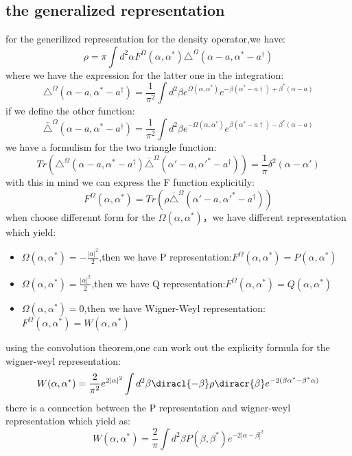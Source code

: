\subsection{the generalized representation}
for the generilized representation for the density operator,we have:
\[\rho=\pi\int d^2\alpha F^{\Omega}(\alpha,\alpha^*)\triangle^{\Omega}(\alpha-a,\alpha^*-a^\dagger)\]
where we have the expression for the latter one in the integration:
\[\triangle^{\Omega}(\alpha-a,\alpha^*-a^\dagger)=\frac{1}{\pi^2}\int d^2\beta e^{\Omega(\alpha,\alpha^*)}e^{-\beta(\alpha^*-a\dagger)+\beta^*(\alpha-a)}\]
if we define the other function:
\[\bar{\triangle}^{\Omega}(\alpha-a,\alpha^*-a^\dagger)=\frac{1}{\pi^2}\int d^2\beta e^{-\Omega(\alpha,\alpha^*)}e^{\beta(\alpha^*-a\dagger)-\beta^*(\alpha-a)}\]
we have a formulism for the two triangle function:
\[Tr(\triangle^{\Omega}(\alpha-a,\alpha^*-a^\dagger)\bar{\triangle}^{\Omega}(\alpha'-a,\alpha'^*-a^\dagger))=\frac{1}{\pi}\delta^2(\alpha-\alpha')\]
with this in mind we can express the F function explicitily:
\[F^{\Omega}(\alpha,\alpha^*)=Tr(\rho\bar{\triangle}^{\Omega}(\alpha'-a,\alpha'^*-a^\dagger))\]
when choose differennt form for the $\Omega(\alpha,\alpha^*)$，we  have different representation which yield:
\begin{itemize}
\item{$\Omega(\alpha,\alpha^*)=-\frac{|\alpha|^2}{2}$,then we have P representation:$F^{\Omega}(\alpha,\alpha^*)=P(\alpha,\alpha^*)$}
\item{$\Omega(\alpha,\alpha^*)=\frac{|\alpha|^2}{2}$,then we have Q representation:$F^{\Omega}(\alpha,\alpha^*)=Q(\alpha,\alpha^*)$}
\item{$\Omega(\alpha,\alpha^*)=0$,then we have Wigner-Weyl representation:$F^{\Omega}(\alpha,\alpha^*)=W(\alpha,\alpha^*)$}
\end{itemize}
using the convolution theorem,one can work out the explicity formula for the wigner-weyl representation:
\[W(\alpha,\alpha^*)=\frac{2}{\pi^2}e^{2|\alpha|^2}\int d^2\beta\diracl{-\beta}\rho\diracr{\beta}e^{-2(\beta\alpha^*-\beta^*\alpha)}\]
there is a connection between the P representation and wigner-weyl representation which yield as:
\[W(\alpha,\alpha^*)=\frac{2}{\pi}\int d^2\beta P(\beta,\beta^*)e^{-2|\alpha-\beta|^2}\]

